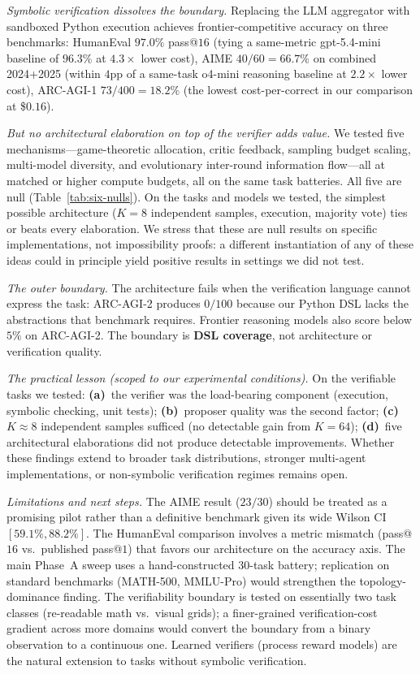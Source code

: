 \documentclass[11pt]{amsart}
\newcommand\1{{\mathds{1}}}
\theoremstyle{definition}
\theoremstyle{remark}
\numberwithin{equation}{section}
\begin{document}
\emph{Symbolic verification dissolves the boundary.}
Replacing the LLM aggregator with sandboxed Python execution achieves frontier-competitive accuracy on three benchmarks:
HumanEval $97.0\%$ pass@$16$ (tying a same-metric gpt-5.4-mini baseline of $96.3\%$ at $4.3\times$ lower cost),
AIME $40/60 = 66.7\%$ on combined 2024+2025 (within $4$pp of a same-task o4-mini reasoning baseline at $2.2\times$ lower cost),
ARC-AGI-1 $73/400 = 18.2\%$ (the lowest cost-per-correct in our comparison at \$$0.16$).

\emph{But no architectural elaboration on top of the verifier adds value.}
We tested five mechanisms---game-theoretic allocation, critic feedback, sampling budget scaling, multi-model diversity, and evolutionary inter-round information flow---all at matched or higher compute budgets, all on the same task batteries.
All five are null (Table~\ref{tab:six-nulls}).
On the tasks and models we tested, the simplest possible architecture ($K\!=\!8$ independent samples, execution, majority vote) ties or beats every elaboration.
We stress that these are null results on specific implementations, not impossibility proofs: a different instantiation of any of these ideas could in principle yield positive results in settings we did not test.

\emph{The outer boundary.}
The architecture fails when the verification language cannot express the task: ARC-AGI-2 produces $0/100$ because our Python DSL lacks the abstractions that benchmark requires.
Frontier reasoning models also score below $5\%$ on ARC-AGI-2.
The boundary is \textbf{DSL coverage}, not architecture or verification quality.

\emph{The practical lesson (scoped to our experimental conditions).}
On the verifiable tasks we tested:
\textbf{(a)}~the verifier was the load-bearing component (execution, symbolic checking, unit tests);
\textbf{(b)}~proposer quality was the second factor;
\textbf{(c)}~$K\!\approx\!8$ independent samples sufficed (no detectable gain from $K\!=\!64$);
\textbf{(d)}~five architectural elaborations did not produce detectable improvements.
Whether these findings extend to broader task distributions, stronger multi-agent implementations, or non-symbolic verification regimes remains open.

\emph{Limitations and next steps.}
The AIME result ($23/30$) should be treated as a promising pilot rather than a definitive benchmark given its wide Wilson CI $[59.1\%, 88.2\%]$.
The HumanEval comparison involves a metric mismatch (pass@$16$ vs.\ published pass@$1$) that favors our architecture on the accuracy axis.
The main Phase~A sweep uses a hand-constructed $30$-task battery; replication on standard benchmarks (MATH-500, MMLU-Pro) would strengthen the topology-dominance finding.
The verifiability boundary is tested on essentially two task classes (re-readable math vs.\ visual grids); a finer-grained verification-cost gradient across more domains would convert the boundary from a binary observation to a continuous one.
Learned verifiers (process reward models) are the natural extension to tasks without symbolic verification.
\end{document}
